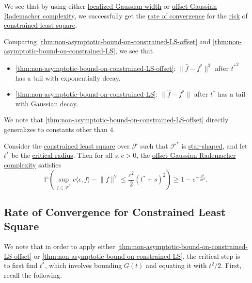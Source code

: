 We see that by using either \hyperref[def:localized-Gaussian-width]{localized Gaussian width} or \hyperref[def:offset-Gaussian-Rademacher-complexity]{offset Gaussian Rademacher complexity}, we successfully get the \hyperref[def:rate-of-convergence]{rate of convergence} for the \hyperref[not:risk]{risk} of \hyperref[prb:constrained-LS]{constrained least square}.

\begin{remark}
	Comparing \autoref{thm:non-asymptotic-bound-on-constrained-LS-offset} and \autoref{thm:non-asymptotic-bound-on-constrained-LS}, we see that
	\begin{itemize}
		\item \autoref{thm:non-asymptotic-bound-on-constrained-LS-offset}: \(\lVert \hat{f} - f^{\ast}  \rVert ^2\) after \({t^{\ast} }^2\) has a tail with exponentially decay.
		\item \autoref{thm:non-asymptotic-bound-on-constrained-LS}: \(\lVert \hat{f} - f^{\ast}  \rVert \) after \(t^{\ast} \) has a tail with Gaussian decay.
	\end{itemize}
\end{remark}

We note that \autoref{thm:non-asymptotic-bound-on-constrained-LS-offset} directly generalizes to constants other than \(4\).

\begin{corollary}\label{col:non-asymptotic-bound-on-constrained-LS-offset}
	Consider the \hyperref[prb:constrained-LS]{constrained least square} over \(\mathscr{F} \) such that \(\mathscr{F} ^{\ast} \) is \hyperref[def:star-shaped]{star-shaped}, and let \(t^{\ast} \) be the \hyperref[def:critical-radius]{critical radius}. Then for all \(s, c > 0\), the \hyperref[def:offset-Gaussian-Rademacher-complexity]{offset Gaussian Rademacher complexity} satisfies
	\[
		\mathbb{P} \left( \sup _{f\in \mathscr{F} ^{\ast} } c \langle \epsilon , f \rangle - \lVert f \rVert ^2 \leq \frac{c^2}{2} (t^{\ast} + s)^2 \right) \geq 1 - e^{-\frac{s^2}{2\sigma ^2}}.
	\]
\end{corollary}

\subsection{Rate of Convergence for Constrained Least Square}
We note that in order to apply either \autoref{thm:non-asymptotic-bound-on-constrained-LS-offset} or \autoref{thm:non-asymptotic-bound-on-constrained-LS}, the critical step is to first find \(t^{\ast} \), which involves bounding \(G(t)\) and equating it with \(t^2 / 2\). First, recall the following.

